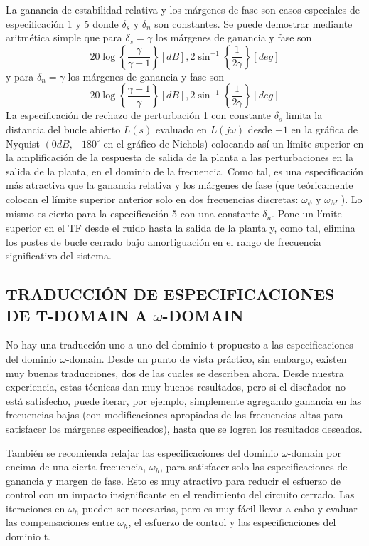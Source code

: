 La ganancia de estabilidad relativa y los márgenes de fase son casos especiales de especificación 1 y 5 donde $\delta_{s}$ y $\delta_{n}$ son constantes. Se puede demostrar mediante aritmética simple que para $\delta_{s}=\gamma$ los márgenes de ganancia y fase son
$$
20 \log \left\{\frac{\gamma}{\gamma-1}\right\}[d B], 2 \sin ^{-1}\left\{\frac{1}{2 \gamma}\right\}[d e g]
$$
y para $\delta_{n}=\gamma$ los márgenes de ganancia y fase son
$$
20 \log \left\{\frac{\gamma+1}{\gamma}\right\}[d B], 2 \sin ^{-1}\left\{\frac{1}{2 \gamma}\right\}[d e g]
$$
La especificación de rechazo de perturbación 1 con constante $\delta_{s}$ limita la distancia del bucle abierto $L(s)$ evaluado en $L(j \omega)$ desde $-1$ en la gráfica de Nyquist $\left(0 d B,-180^{\circ}\right.$ en el gráfico de Nichols) colocando así un límite superior en la amplificación de la respuesta de salida de la planta a las perturbaciones en la salida de la planta,  en el dominio de la frecuencia. Como tal, es una especificación más atractiva que la ganancia relativa y los márgenes de fase (que teóricamente colocan el límite superior anterior solo en dos frecuencias discretas: $\omega_{\phi}$ y $\omega_{M}$ ). Lo mismo es cierto para la especificación 5 con una constante $\delta_{n}$. Pone un límite superior en el TF desde el ruido hasta la salida de la planta y, como tal, elimina los postes de bucle cerrado bajo amortiguación en el rango de frecuencia significativo del sistema.

\subsection{TRADUCCIÓN DE ESPECIFICACIONES DE T-DOMAIN A $\omega$-DOMAIN}
No hay una traducción uno a uno del dominio t propuesto a las especificaciones del dominio $\omega$-domain. Desde un punto de vista práctico, sin embargo, existen muy buenas traducciones, dos de las cuales se describen ahora. Desde nuestra experiencia, estas técnicas dan muy buenos resultados, pero si el diseñador no está satisfecho, puede iterar, por ejemplo, simplemente agregando ganancia en las frecuencias bajas (con modificaciones apropiadas de las frecuencias altas para satisfacer los márgenes especificados), hasta que se logren los resultados deseados.

También se recomienda relajar las especificaciones del dominio $\omega$-domain por encima de una cierta frecuencia, $\omega_{h}$, para satisfacer solo las especificaciones de ganancia y margen de fase. Esto es muy atractivo para reducir el esfuerzo de control con un impacto insignificante en el rendimiento del circuito cerrado. Las iteraciones en $\omega_{h}$ pueden ser necesarias, pero es muy fácil llevar a cabo y evaluar las compensaciones entre $\omega_{h}$, el esfuerzo de control y las especificaciones del dominio t.

